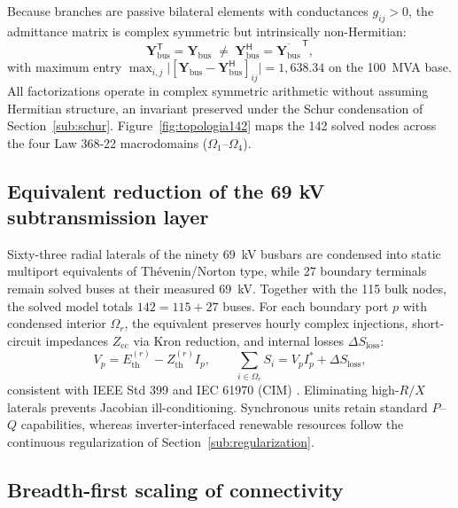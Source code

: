 Because branches are passive bilateral elements with conductances $g_{ij} > 0$, the admittance matrix is complex symmetric but intrinsically non-Hermitian:
\begin{equation}
\mathbf{Y}_{\mathrm{bus}}^{\mathsf{T}} = \mathbf{Y}_{\mathrm{bus}} \;\ne\; \mathbf{Y}_{\mathrm{bus}}^{\mathsf{H}} = \overline{\mathbf{Y}_{\mathrm{bus}}}^{\,\mathsf{T}},
\label{eq:nonhermitian}
\end{equation}
with maximum entry $\max_{i,j}\bigl|[\mathbf{Y}_{\mathrm{bus}} - \mathbf{Y}_{\mathrm{bus}}^{\mathsf{H}}]_{ij}\bigr| = 1{,}638.34$ on the 100~MVA base. All factorizations operate in complex symmetric arithmetic without assuming Hermitian structure, an invariant preserved under the Schur condensation of Section~\ref{sub:schur}. Figure~\ref{fig:topologia142} maps the 142 solved nodes across the four Law 368-22 macrodomains ($\Omega_1$--$\Omega_4$).



\subsection{Equivalent reduction of the 69 kV subtransmission layer}
\label{sub:reduction}

Sixty-three radial laterals of the ninety 69~kV busbars are condensed into static multiport equivalents of Th\'evenin/Norton type, while 27 boundary terminals remain solved buses at their measured 69~kV. Together with the 115 bulk nodes, the solved model totals $142 = 115 + 27$ buses. For each boundary port $p$ with condensed interior $\Omega_r$, the equivalent preserves hourly complex injections, short-circuit impedances $Z_{\mathrm{cc}}$ via Kron reduction, and internal losses $\Delta S_{\mathrm{loss}}$:
\begin{equation}
V_p = E_{\mathrm{th}}^{(r)} - Z_{\mathrm{th}}^{(r)} I_p, \qquad \sum_{i \in \Omega_r} S_i = V_p I_p^{*} + \Delta S_{\mathrm{loss}},
\label{eq:thevenin}
\end{equation}
consistent with IEEE Std 399 \cite{ieee399} and IEC 61970 (CIM) \cite{iec61970}. Eliminating high-$R/X$ laterals prevents Jacobian ill-conditioning. Synchronous units retain standard $P$--$Q$ capabilities, whereas inverter-interfaced renewable resources follow the continuous regularization of Section~\ref{sub:regularization}.

\subsection{Breadth-first scaling of connectivity}
\label{sub:bfs}


